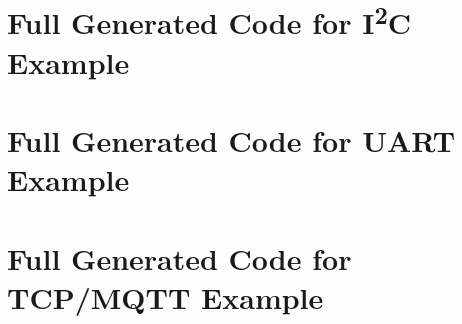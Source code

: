 
%




\chapter{Full Generated Code for I\texorpdfstring{\textsuperscript{2}}{2}C Example}
\label{appendix:i2c}



\chapter{Full Generated Code for UART Example}
\label{appendix:uart}




\chapter{Full Generated Code for TCP/MQTT Example}
\label{appendix:tcp}


